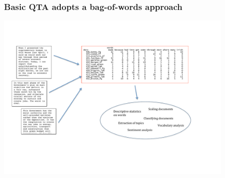 \documentclass[notes=hide]{beamer}
\begin{document}


\begin{frame}
	\frametitle{Basic QTA adopts a bag-of-words approach}
	\includegraphics[width=11.5cm]{figures/workflow.pdf}
\end{frame}
\end{document}
